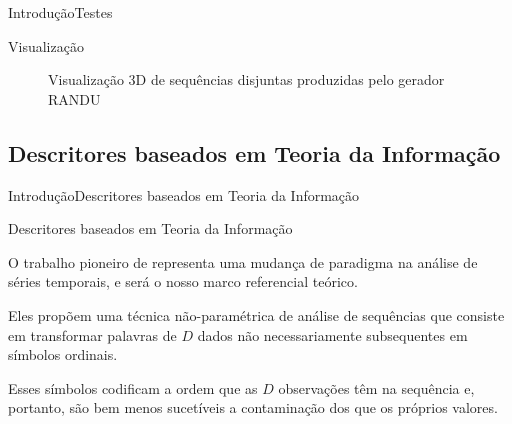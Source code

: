 \documentclass[10pt,xcolor={dvipsnames}]{beamer}
\begin{document}
\begin{frame}{Introdução}{Testes}
\begin{block}{Visualização}
	\begin{figure}[hbt]
		\centering
		\pause
		\caption{Visualização 3D de sequências disjuntas produzidas pelo gerador RANDU}\label{fig:3DRandu}
	\end{figure}
\end{block}
\end{frame}

\subsection{Descritores baseados em Teoria da Informação}

\begin{frame}{Introdução}{Descritores baseados em Teoria da Informação}

\begin{block}{Descritores baseados em Teoria da Informação}
	\pause

	O trabalho pioneiro de \cite{PermutationEntropyBandtPompe} representa uma mudança de paradigma na análise de séries temporais, e será o nosso marco referencial teórico.
	\pause	
	
	Eles propõem uma técnica não-paramétrica de análise de sequências que consiste em transformar palavras de $D$ dados não necessariamente subsequentes em símbolos ordinais.
	\pause
	
	Esses símbolos codificam a ordem que as $D$ observações têm na sequência e, portanto, são bem menos sucetíveis a contaminação dos que os próprios valores.
\end{block}
\end{frame}
\end{document}
